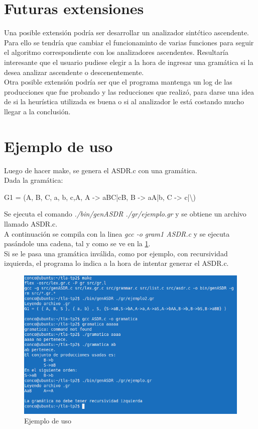 \documentclass{article}
\begin{document}
\section{Futuras extensiones}
Una posible extensi\'on podr\'ia ser desarrollar un analizador sint\'ctico ascendente. Para ello se tendr\'ia que cambiar el funcionaminto de varias funciones para seguir el algoritmo correspondiente con los analizadores ascendentes. Resultar\'ia interesante que el usuario pudiese elegir a la hora de ingresar una gram\'atica si la desea analizar ascendente o descenentemente.\\
Otra posible extensi\'on podr\'ia ser que el programa mantenga un log de las producciones que fue probando y las reducciones que realiz\'o, para darse una idea de si la heur\'istica utilizada es buena o si al analizador le est\'a costando mucho llegar a la conclusi\'on.\\


\section{Ejemplo de uso}
Luego de hacer make, se genera el ASDR.c con una gram\'atica.\\
Dada la gram\'atica:
\begin{center}
G1 = ({A, B, C}, {a, b, c},A, {A -> aBC|cB, B -> aA|b, C -> c|\textbackslash})
\end{center}
Se ejecuta el comando \textit{./bin/genASDR ./gr/ejemplo.gr} y se obtiene un archivo llamado ASDR.c.\\
A continuaci\'on se compila con la linea \textit{gcc -o gram1 ASDR.c} y se ejecuta pas\'andole una cadena, tal y como se ve en la \ref{fig:ejemplo}.\\
Si se le pasa una gram\'atica inv\'alida, como por ejemplo, con recursividad izquierda, el programa lo indica a la hora de intentar generar el ASDR.c.
 
\begin{figure}[H]
\centering
\includegraphics[scale=0.6]{./fotos/ejemplo.png}
\caption{ Ejemplo de uso}
\label{fig:ejemplo}
\end{figure}
\end{document}
